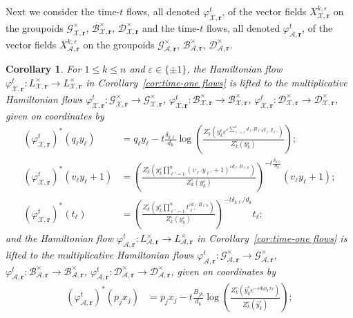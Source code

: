 \documentclass{amsart}
\newtheorem{corollary}[theorem]{Corollary}
\numberwithin{equation}{section}
\newcommand{\bfr}{{\boldsymbol{r}}}
\newcommand{\cA}{\mathcal{A}}
\newcommand{\cB}{\mathcal{B}}
\newcommand{\cD}{\mathcal{D}}
\newcommand{\cG}{\mathcal{G}}
\newcommand{\cX}{\mathcal{X}}
\begin{document}
Next we consider the time-$t$ flows, all denoted $\varphi_{\cX,\bfr}^t$, of the vector fields $X_{\cX,\bfr}^{k,\varepsilon}$ on the groupoids $\cG^\times_{\cX,\bfr}$, $\cB^\times_{\cX,\bfr}$, $\cD^\times_{\cX,\bfr}$ and the time-$t$ flows, all denoted $\varphi_{\cA,\bfr}^t$, of the vector fields $X_{\cA,\bfr}^{k,\varepsilon}$ on the groupoids $\cG^\times_{\cA,\bfr}$, $\cB^\times_{\cA,\bfr}$, $\cD^\times_{\cA,\bfr}$.
\begin{corollary}
  \label{cor:groupoid hamiltonian flows}
  For $1\le k\le n$ and $\varepsilon\in\{\pm1\}$, the Hamiltonian flow $\varphi_{\cX,\bfr}^t: L^\times_{\cX,\bfr} \to L^\times_{\cX,\bfr}$ in Corollary~\ref{cor:time-one flows} is lifted to the multiplicative Hamiltonian flows $\varphi_{\cX,\bfr}^t: \cG^\times_{\cX,\bfr} \to \cG^\times_{\cX,\bfr}$, $\varphi_{\cX,\bfr}^t: \cB^\times_{\cX,\bfr} \to \cB^\times_{\cX,\bfr}$, $\varphi_{\cX,\bfr}^t: \cD^\times_{\cX,\bfr} \to \cD^\times_{\cX,\bfr}$, given on coordinates by
  \begin{align*}
    (\varphi_{\cX,\bfr}^t)^*(q_\ell y_\ell)&=q_\ell y_\ell-t\frac{\delta_{k\ell}}{d_k}\log\left(\frac{Z_k^\circ\left(y_k^\varepsilon e^{\varepsilon\sum_{\ell'=1}^n d_{\ell'} B_{\ell' k}q_{\ell'} y_{\ell'}}\right)}{Z_k^\circ(y_k^\varepsilon)}\right);\\
    (\varphi_{\cX,\bfr}^t)^*(v_\ell y_\ell + 1)&=\left(\frac{Z_k^\circ\left(y_k^\varepsilon \prod_{\ell'=1}^n (v_{\ell'} y_{\ell'} + 1)^{\varepsilon d_{\ell'} B_{\ell' k}}\right)}{Z_k^\circ(y_k^\varepsilon)}\right)^{-t\frac{\delta_{k\ell}}{d_k}}(v_\ell y_\ell+1);\\
    (\varphi_{\cX,\bfr}^t)^*(t_\ell)&=\left(\frac{Z_k^\circ\left(y_k^\varepsilon \prod_{\ell'=1}^n t_{\ell'}^{\varepsilon d_{\ell'} B_{\ell' k}}\right)}{Z_k^\circ(y_k^\varepsilon)}\right)^{-t\delta_{k\ell}/d_k}t_\ell;
  \end{align*}
  and the Hamiltonian flow $\varphi_{\cA,\bfr}^t: L^\times_{\cA,\bfr} \to L^\times_{\cA,\bfr}$ in Corollary~\ref{cor:time-one flows} is lifted to the multiplicative Hamiltonian flows $\varphi_{\cA,\bfr}^t: \cG^\times_{\cA,\bfr} \to \cG^\times_{\cA,\bfr}$, $\varphi_{\cA,\bfr}^t: \cB^\times_{\cA,\bfr} \to \cB^\times_{\cA,\bfr}$, $\varphi_{\cA,\bfr}^t: \cD^\times_{\cA,\bfr} \to \cD^\times_{\cA,\bfr}$, given on coordinates by
  \begin{align*}
    (\varphi_{\cA,\bfr}^t)^*(p_jx_j)&=p_jx_j-t\frac{B_{jk}}{d_k}\log\left(\frac{Z_k^\circ\left(\hat y_k^\varepsilon e^{-\varepsilon d_kp_kx_k}\right)}{Z_k^\circ(\hat y_k^\varepsilon)}\right);\\

\end{align*}
\end{corollary}
\end{document}

